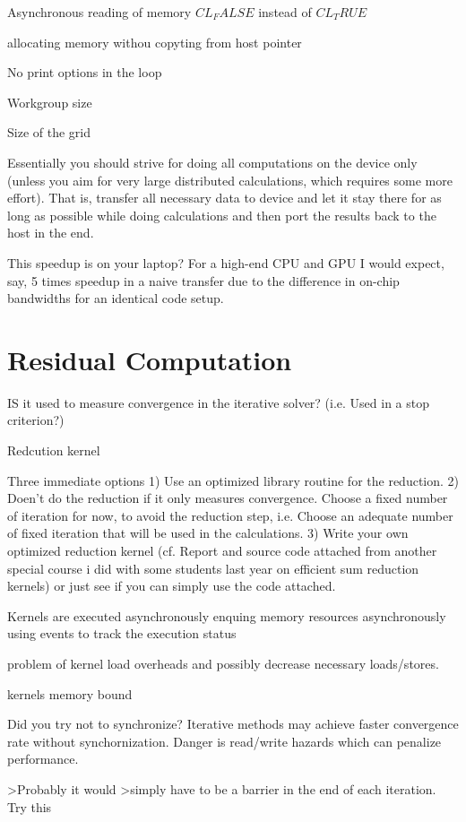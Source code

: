 Asynchronous reading of memory $CL_FALSE$ instead of $CL_TRUE$

allocating memory withou copyting from host pointer

No print options in the loop

Workgroup size

Size of the grid

Essentially you should strive for doing all computations on the device
only (unless you aim for very large distributed calculations, which
requires some more effort). That is, transfer all necessary data to device
and let it stay there for as long as possible while doing calculations and
then port the results back to the host in the end.


This speedup is on your laptop? For a high-end CPU and GPU I would expect,
say, 5 times speedup in a naive transfer due to the difference in on-chip
bandwidths for an identical code setup.

\section{Residual Computation}
IS it used to measure convergence in the iterative solver? (i.e. Used
in a stop criterion?)

Redcution kernel

Three immediate options
1) Use an optimized library routine for the reduction.
2) Doen't do the reduction if it only measures convergence. Choose a fixed
number of iteration for now, to avoid the reduction step, i.e. Choose an
adequate number of fixed iteration that will be used in the calculations.
3) Write your own optimized reduction kernel (cf. Report and source code
attached from another special course i did with some students last year on
efficient sum reduction kernels) or just see if you can simply use the
code attached.



Kernels are executed asynchronously
enquing memory resources asynchronously
using events to track the execution status

problem of kernel load overheads and possibly decrease
necessary loads/stores.

kernels memory bound

Did you try not to synchronize? Iterative methods may achieve faster
convergence rate without synchornization. Danger is read/write hazards
which can penalize performance.

>Probably it would
>simply have to be a barrier in the end of each iteration.
Try this


